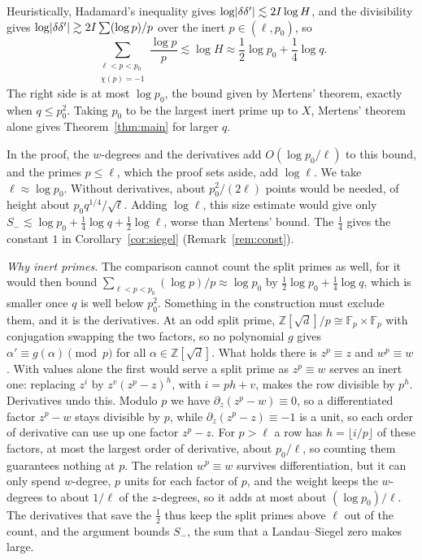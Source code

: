 \documentclass[11pt]{amsart}
\theoremstyle{remark}
\newcommand{\Z}{\mathbb{Z}}
\newcommand{\F}{\mathbb{F}}
\newcommand{\sd}{\sqrt{d}}
\DeclarePairedDelimiter\abs{\lvert}{\rvert}
\begin{document}
Heuristically, Hadamard's inequality gives $\log\abs{\delta\delta'}\lesssim2I\log H$, and the
divisibility gives $\log\abs{\delta\delta'}\gtrsim2I\sum(\log p)/p$ over the inert $p\in(\ell,p_0)$, so
\[
\sum_{\substack{\ell<p<p_0\\ \chi(p)=-1}}\frac{\log p}p\lesssim\log H\approx\frac12\log p_0+\frac14\log q.
\]
The right side is at most $\log p_0$, the bound given by Mertens' theorem, exactly when $q\le p_0^2$.
Taking $p_0$ to be the largest inert prime up to $X$, Mertens' theorem alone gives Theorem~\ref{thm:main} for larger $q$.

In the proof, the $w$-degrees and the derivatives add $O(\log p_0/\ell)$ to this bound, and the primes
$p\le\ell$, which the proof sets aside, add $\log\ell$. We take $\ell\approx\log p_0$. Without derivatives, about $p_0^2/(2\ell)$ points would be needed,
of height about $p_0q^{1/4}/\sqrt\ell$. Adding $\log\ell$, this size estimate would give only
$S_-\lesssim\log p_0+\frac14\log q+\frac12\log\ell$, worse than Mertens' bound. The $\frac14$ gives the
constant $1$ in Corollary~\ref{cor:siegel} (Remark~\ref{rem:const}).

\emph{Why inert primes.} The comparison cannot count the split primes as well, for it would then bound
$\sum_{\ell<p<p_0}(\log p)/p\approx\log p_0$ by $\frac12\log p_0+\frac14\log q$, which is smaller once $q$ is well below
$p_0^2$. Something in the construction must exclude them, and it is the derivatives. At an odd split prime,
$\Z[\sd]/p\cong\F_p\times\F_p$ with conjugation swapping the two factors, so no polynomial $g$ gives
$\alpha'\equiv g(\alpha)\pmod p$ for all $\alpha\in\Z[\sd]$. What holds there is $z^p\equiv z$ and $w^p\equiv w$. With
values alone the first would serve a split prime as $z^p\equiv w$ serves an inert one: replacing $z^i$ by
$z^v(z^p-z)^h$, with $i=ph+v$, makes the row divisible by $p^h$. Derivatives undo this. Modulo $p$ we have
$\partial_z(z^p-w)\equiv0$, so a differentiated factor $z^p-w$ stays divisible by $p$, while $\partial_z(z^p-z)\equiv-1$
is a unit, so each order of derivative can use up one factor $z^p-z$. For $p>\ell$ a row has $h=\lfloor i/p\rfloor$ of
these factors, at most the largest order of derivative, about $p_0/\ell$, so counting them guarantees nothing at $p$.
The relation $w^p\equiv w$ survives differentiation, but it can only spend $w$-degree, $p$ units for each factor of $p$,
and the weight keeps the $w$-degrees to about $1/\ell$ of the $z$-degrees, so it adds at most about $(\log p_0)/\ell$.
The derivatives that save the $\frac12$ thus keep the split primes above $\ell$ out of the count, and the argument
bounds $S_-$, the sum that a Landau--Siegel zero makes large.
\end{document}

